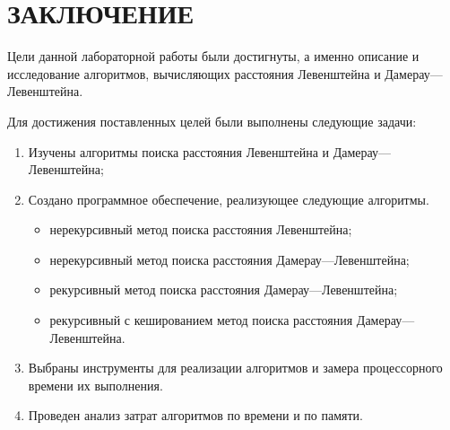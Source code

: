 \chapter*{ЗАКЛЮЧЕНИЕ}

Цели данной лабораторной работы были достигнуты, а именно описание и исследование алгоритмов, вычисляющих расстояния Левенштейна и Дамерау---Левенштейна.

Для достижения поставленных целей были выполнены следующие задачи:
\begin{enumerate}
	\item Изучены алгоритмы поиска расстояния Левенштейна и \newline Дамерау---Левенштейна;
	\item Создано программное обеспечение, реализующее следующие алгоритмы.
	\begin{itemize}
		\item нерекурсивный метод поиска расстояния Левенштейна;
		\item нерекурсивный метод поиска расстояния Дамерау---Левенштейна;
		\item рекурсивный метод поиска расстояния Дамерау---Левенштейна;
		\item рекурсивный с кешированием метод поиска расстояния Дамерау---Левенштейна.
	\end{itemize}
	\item Выбраны инструменты для реализации алгоритмов и замера процессорного времени их выполнения.
	\item Проведен анализ затрат алгоритмов по времени и по памяти. 
\end{enumerate}